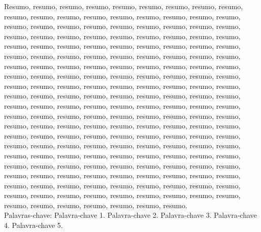 \begin{resumo}

Resumo, resumo, resumo, resumo, resumo, resumo, resumo, resumo, resumo, resumo, resumo, resumo, resumo, resumo, resumo, resumo, resumo, resumo, resumo, resumo, resumo, resumo, resumo, resumo, resumo, resumo, resumo, resumo, resumo, resumo, resumo, resumo, resumo, resumo, resumo, resumo, resumo, resumo, resumo, resumo, resumo, resumo, resumo, resumo, resumo, resumo, resumo, resumo, resumo, resumo, resumo, resumo, resumo, resumo, resumo, resumo, resumo, resumo, resumo, resumo, resumo, resumo, resumo, resumo, resumo, resumo, resumo, resumo, resumo, resumo, resumo, resumo, resumo, resumo, resumo, resumo, resumo, resumo, resumo, resumo, resumo, resumo, resumo, resumo, resumo, resumo, resumo, resumo, resumo, resumo, resumo, resumo, resumo, resumo, resumo, resumo, resumo, resumo, resumo, resumo, resumo, resumo, resumo, resumo, resumo, resumo, resumo, resumo, resumo, resumo, resumo, resumo, resumo, resumo, resumo, resumo, resumo, resumo, resumo, resumo, resumo, resumo, resumo, resumo, resumo, resumo, resumo, resumo, resumo, resumo, resumo, resumo, resumo, resumo, resumo, resumo, resumo, resumo, resumo, resumo, resumo, resumo, resumo, resumo, resumo, resumo, resumo, resumo, resumo, resumo, resumo, resumo, resumo, resumo, resumo, resumo, resumo, resumo, resumo, resumo, resumo, resumo, resumo, resumo, resumo, resumo, resumo, resumo, resumo, resumo, resumo, resumo, resumo, resumo, resumo, resumo, resumo, resumo, resumo, resumo, resumo, resumo, resumo, resumo, resumo, resumo, resumo.
\\[18pt]
Palavras-chave: Palavra-chave 1. Palavra-chave 2. Palavra-chave 3. Palavra-chave 4. Palavra-chave 5. %
\end{resumo}
